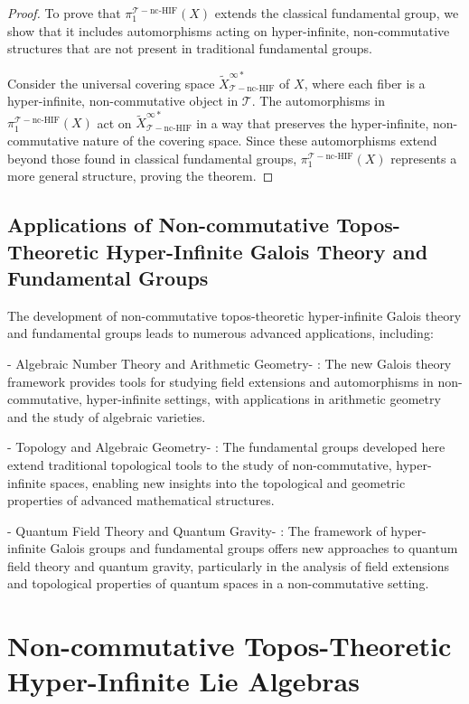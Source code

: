 \documentclass{article}
\begin{document}
\begin{proof}
To prove that \(\pi_1^{\mathcal{T}-\text{nc-HIF}}(X)\) extends the classical fundamental group, we show that it includes automorphisms acting on hyper-infinite, non-commutative structures that are not present in traditional fundamental groups.

Consider the universal covering space \(\widetilde{X}_{\mathcal{T}-\text{nc-HIF}}^{\infty *}\) of \(X\), where each fiber is a hyper-infinite, non-commutative object in \(\mathcal{T}\). The automorphisms in \(\pi_1^{\mathcal{T}-\text{nc-HIF}}(X)\) act on \(\widetilde{X}_{\mathcal{T}-\text{nc-HIF}}^{\infty *}\) in a way that preserves the hyper-infinite, non-commutative nature of the covering space. Since these automorphisms extend beyond those found in classical fundamental groups, \(\pi_1^{\mathcal{T}-\text{nc-HIF}}(X)\) represents a more general structure, proving the theorem.
\end{proof}

\subsection{Applications of Non-commutative Topos-Theoretic Hyper-Infinite Galois Theory and Fundamental Groups}
The development of non-commutative topos-theoretic hyper-infinite Galois theory and fundamental groups leads to numerous advanced applications, including:

-  Algebraic Number Theory and Arithmetic Geometry- : The new Galois theory framework provides tools for studying field extensions and automorphisms in non-commutative, hyper-infinite settings, with applications in arithmetic geometry and the study of algebraic varieties.

-  Topology and Algebraic Geometry- : The fundamental groups developed here extend traditional topological tools to the study of non-commutative, hyper-infinite spaces, enabling new insights into the topological and geometric properties of advanced mathematical structures.

-  Quantum Field Theory and Quantum Gravity- : The framework of hyper-infinite Galois groups and fundamental groups offers new approaches to quantum field theory and quantum gravity, particularly in the analysis of field extensions and topological properties of quantum spaces in a non-commutative setting.



\section{Non-commutative Topos-Theoretic Hyper-Infinite Lie Algebras}
\end{document}
